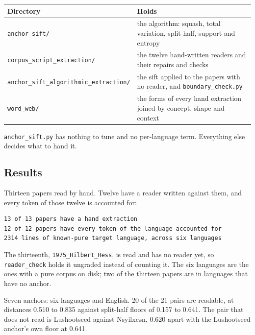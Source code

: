 \tiny
\setlength{\tabcolsep}{2pt}
\begin{longtable}{@{}>{\raggedright\arraybackslash}p{}>{\raggedright\arraybackslash}p{}@{}}
\toprule
Directory & Holds \\
\midrule
\texttt{anchor\_\allowbreak{}sift/\allowbreak{}} & the algorithm: squash, total variation, split-half, support and entropy \\
\texttt{corpus\_\allowbreak{}script\_\allowbreak{}extraction/\allowbreak{}} & the twelve hand-written readers and their repairs and checks \\
\texttt{anchor\_\allowbreak{}sift\_\allowbreak{}algorithmic\_\allowbreak{}extraction/\allowbreak{}} & the sift applied to the papers with no reader, and \texttt{boundary\_\allowbreak{}check.\allowbreak{}py} \\
\texttt{word\_\allowbreak{}web/\allowbreak{}} & the forms of every hand extraction joined by concept, shape and context \\
\bottomrule
\end{longtable}
\normalsize

\texttt{anchor\_\allowbreak{}sift.\allowbreak{}py} has nothing to tune and no per-language term. Everything else decides what to hand it.

\subsection{Results}

Thirteen papers read by hand. Twelve have a reader written against them, and every token of those twelve is accounted for:

\begin{lstlisting}[breaklines=true,breakatwhitespace=false,basicstyle=\ttfamily\small]
13 of 13 papers have a hand extraction
12 of 12 papers have every token of the language accounted for
2314 lines of known-pure target language, across six languages
\end{lstlisting}

The thirteenth, \texttt{1975\_\allowbreak{}Hilbert\_\allowbreak{}Hess}, is read and has no reader yet, so \texttt{reader\_\allowbreak{}check} holds it ungraded instead of counting it. The six languages are the ones with a pure corpus on disk; two of the thirteen papers are in languages that have no anchor.

Seven anchors: six languages and English. 20 of the 21 pairs are readable, at distances 0.510 to 0.835 against split-half floors of 0.157 to 0.641. The pair that does not read is Lushootseed against Nsyilxcən, 0.620 apart with the Lushootseed anchor's own floor at 0.641.

